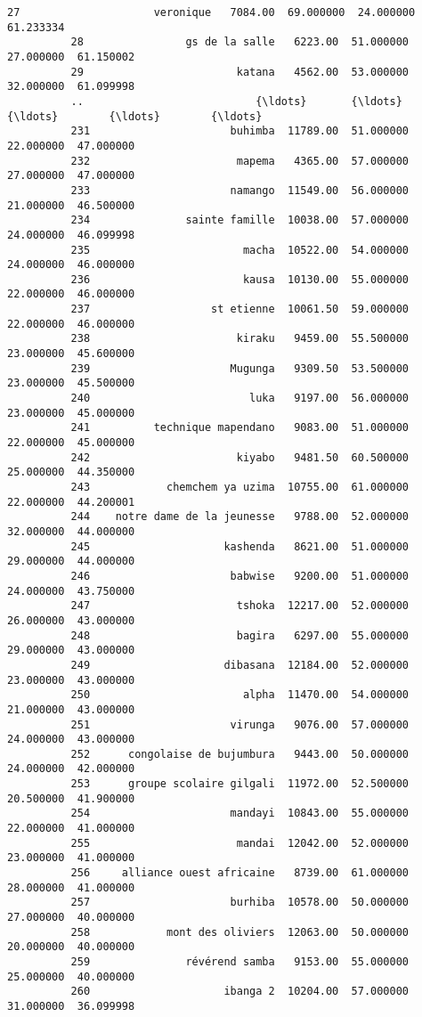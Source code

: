 \documentclass[11pt]{article}
\begin{document}
\begin{Verbatim}[commandchars=\\\{\}]
          27                     veronique   7084.00  69.000000  24.000000  61.233334   
          28                gs de la salle   6223.00  51.000000  27.000000  61.150002   
          29                        katana   4562.00  53.000000  32.000000  61.099998   
          ..                           {\ldots}       {\ldots}        {\ldots}        {\ldots}        {\ldots}   
          231                      buhimba  11789.00  51.000000  22.000000  47.000000   
          232                       mapema   4365.00  57.000000  27.000000  47.000000   
          233                      namango  11549.00  56.000000  21.000000  46.500000   
          234               sainte famille  10038.00  57.000000  24.000000  46.099998   
          235                        macha  10522.00  54.000000  24.000000  46.000000   
          236                        kausa  10130.00  55.000000  22.000000  46.000000   
          237                   st etienne  10061.50  59.000000  22.000000  46.000000   
          238                       kiraku   9459.00  55.500000  23.000000  45.600000   
          239                      Mugunga   9309.50  53.500000  23.000000  45.500000   
          240                         luka   9197.00  56.000000  23.000000  45.000000   
          241          technique mapendano   9083.00  51.000000  22.000000  45.000000   
          242                       kiyabo   9481.50  60.500000  25.000000  44.350000   
          243            chemchem ya uzima  10755.00  61.000000  22.000000  44.200001   
          244    notre dame de la jeunesse   9788.00  52.000000  32.000000  44.000000   
          245                     kashenda   8621.00  51.000000  29.000000  44.000000   
          246                      babwise   9200.00  51.000000  24.000000  43.750000   
          247                       tshoka  12217.00  52.000000  26.000000  43.000000   
          248                       bagira   6297.00  55.000000  29.000000  43.000000   
          249                     dibasana  12184.00  52.000000  23.000000  43.000000   
          250                        alpha  11470.00  54.000000  21.000000  43.000000   
          251                      virunga   9076.00  57.000000  24.000000  43.000000   
          252      congolaise de bujumbura   9443.00  50.000000  24.000000  42.000000   
          253      groupe scolaire gilgali  11972.00  52.500000  20.500000  41.900000   
          254                      mandayi  10843.00  55.000000  22.000000  41.000000   
          255                       mandai  12042.00  52.000000  23.000000  41.000000   
          256     alliance ouest africaine   8739.00  61.000000  28.000000  41.000000   
          257                      burhiba  10578.00  50.000000  27.000000  40.000000   
          258            mont des oliviers  12063.00  50.000000  20.000000  40.000000   
          259               révérend samba   9153.00  55.000000  25.000000  40.000000   
          260                     ibanga 2  10204.00  57.000000  31.000000  36.099998   
          

\end{Verbatim}
\end{document}
